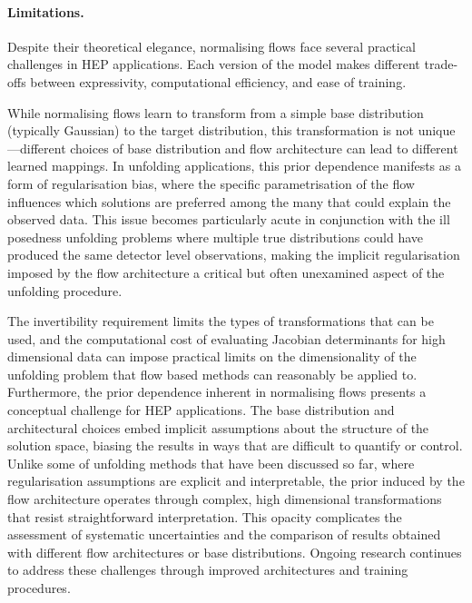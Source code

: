         \paragraph{Limitations.}
            Despite their theoretical elegance, normalising flows face several practical challenges in HEP applications.
            Each version of the model makes different trade-offs between expressivity, computational efficiency, and ease of training.
            
            While normalising flows learn to transform from a simple base distribution (typically Gaussian) to the target distribution, this transformation is not unique---different choices of base distribution and flow architecture can lead to different learned mappings.
            In unfolding applications, this prior dependence manifests as a form of regularisation bias, where the specific parametrisation of the flow influences which solutions are preferred among the many that could explain the observed data.
            This issue becomes particularly acute in conjunction with the ill posedness unfolding problems where multiple true distributions could have produced the same detector level observations, making the implicit regularisation imposed by the flow architecture a critical but often unexamined aspect of the unfolding procedure.
            
            The invertibility requirement limits the types of transformations that can be used, and the computational cost of evaluating Jacobian determinants for high dimensional data can impose practical limits on the dimensionality of the unfolding problem that flow based methods can reasonably be applied to.
            Furthermore, the prior dependence inherent in normalising flows presents a conceptual challenge for HEP applications.
            The base distribution and architectural choices embed implicit assumptions about the structure of the solution space, biasing the results in ways that are difficult to quantify or control.
            Unlike some of unfolding methods that have been discussed so far, where regularisation assumptions are explicit and interpretable, the prior induced by the flow architecture operates through complex, high dimensional transformations that resist straightforward interpretation.
            This opacity complicates the assessment of systematic uncertainties and the comparison of results obtained with different flow architectures or base distributions.
            Ongoing research continues to address these challenges through improved architectures and training procedures.
        
